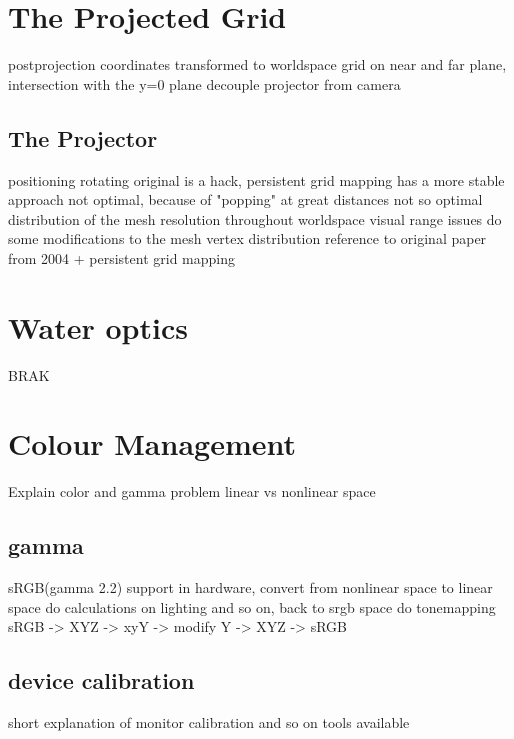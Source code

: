 \section{The Projected Grid}

postprojection coordinates transformed to worldspace
grid on near and far plane, intersection with the y=0 plane
decouple projector from camera

\subsection{The Projector}
positioning
rotating
original is a hack, persistent grid mapping has a more stable approach
not optimal, because of "popping" at great distances
not so optimal distribution of the mesh resolution throughout worldspace
visual range issues
do some modifications to the mesh vertex distribution
reference to original paper from 2004 + persistent grid mapping

\section{Water optics}
BRAK

\section{Colour Management}

Explain color and gamma problem
linear vs nonlinear space

\subsection{gamma}
sRGB(gamma 2.2) support in hardware, convert from nonlinear space to linear
space do calculations on lighting and so on, back to srgb space
do tonemapping sRGB -> XYZ -> xyY -> modify Y -> XYZ -> sRGB

\subsection{device calibration}
short explanation of monitor calibration and so on
tools available


